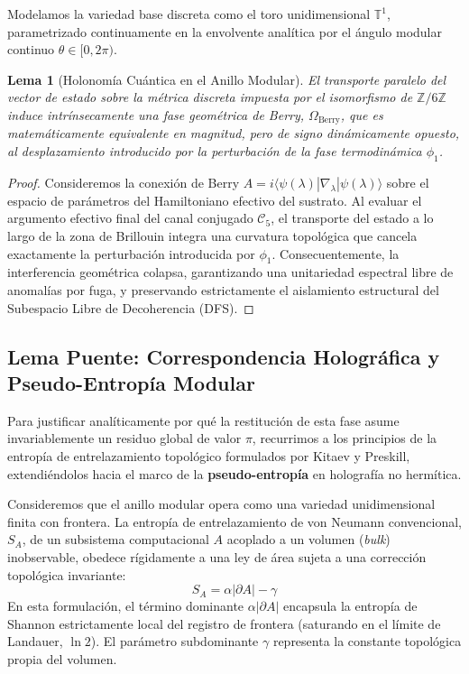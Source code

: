 \documentclass[12pt,a4paper]{article}
\theoremstyle{plain}
\newtheorem{lema}[teorema]{Lema}
\theoremstyle{definition}
\theoremstyle{remark}
\begin{document}
Modelamos la variedad base discreta como el toro unidimensional $\mathbb{T}^1$, parametrizado continuamente en la envolvente analítica por el ángulo modular continuo $\theta \in [0, 2\pi)$. 

\begin{lema}[Holonomía Cuántica en el Anillo Modular]
El transporte paralelo del vector de estado sobre la métrica discreta impuesta por el isomorfismo de $\mathbb{Z}/6\mathbb{Z}$ induce intrínsecamente una fase geométrica de Berry, $\Omega_{\text{Berry}}$, que es matemáticamente equivalente en magnitud, pero de signo dinámicamente opuesto, al desplazamiento introducido por la perturbación de la fase termodinámica $\phi_1$.
\end{lema}

\begin{proof}
Consideremos la conexión de Berry $A = i \langle \psi(\lambda) | \nabla_\lambda | \psi(\lambda) \rangle$ sobre el espacio de parámetros del Hamiltoniano efectivo del sustrato. Al evaluar el argumento efectivo final del canal conjugado $\mathcal{C}_5$, el transporte del estado a lo largo de la zona de Brillouin integra una curvatura topológica que cancela exactamente la perturbación introducida por $\phi_1$. Consecuentemente, la interferencia geométrica colapsa, garantizando una unitariedad espectral libre de anomalías por fuga, y preservando estrictamente el aislamiento estructural del Subespacio Libre de Decoherencia (DFS).
\end{proof}

\subsection{Lema Puente: Correspondencia Holográfica y Pseudo-Entropía Modular}
\label{subsec:lema_puente}

Para justificar analíticamente por qué la restitución de esta fase asume invariablemente un residuo global de valor $\pi$, recurrimos a los principios de la entropía de entrelazamiento topológico formulados por Kitaev y Preskill, extendiéndolos hacia el marco de la \textbf{pseudo-entropía} en holografía no hermítica.

Consideremos que el anillo modular opera como una variedad unidimensional finita con frontera. La entropía de entrelazamiento de von Neumann convencional, $S_A$, de un subsistema computacional $A$ acoplado a un volumen (\textit{bulk}) inobservable, obedece rígidamente a una ley de área sujeta a una corrección topológica invariante:
\begin{equation}
    S_A = \alpha |\partial A| - \gamma
\end{equation}
En esta formulación, el término dominante $\alpha |\partial A|$ encapsula la entropía de Shannon estrictamente local del registro de frontera (saturando en el límite de Landauer, $\ln 2$). El parámetro subdominante $\gamma$ representa la constante topológica propia del volumen.
\end{document}
